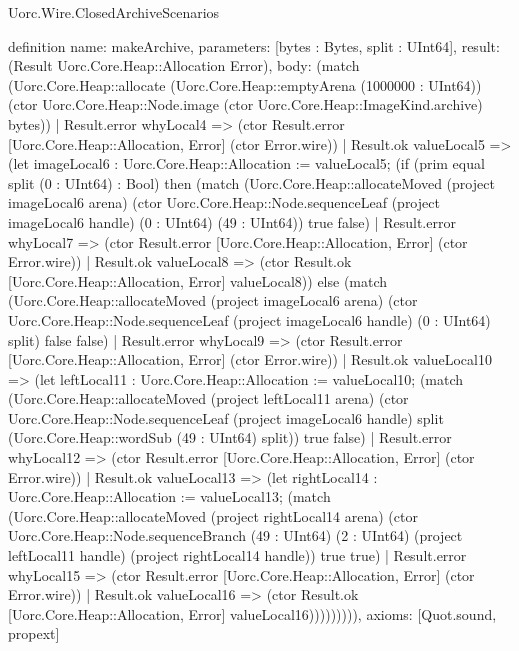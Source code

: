 \begin{lexlean}{Uorc.Wire.ClosedArchiveScenarios}
\begin{semanticmodule}
definition{
  name: makeArchive,
  parameters: [bytes : Bytes, split : UInt64],
  result: (Result Uorc.Core.Heap::Allocation Error),
  body: (match (Uorc.Core.Heap::allocate (Uorc.Core.Heap::emptyArena (1000000 : UInt64)) (ctor Uorc.Core.Heap::Node.image (ctor Uorc.Core.Heap::ImageKind.archive) bytes))
    | Result.error whyLocal4 => (ctor Result.error [Uorc.Core.Heap::Allocation, Error] (ctor Error.wire))
    | Result.ok valueLocal5 => (let imageLocal6 : Uorc.Core.Heap::Allocation := valueLocal5; (if (prim equal split (0 : UInt64) : Bool) then (match (Uorc.Core.Heap::allocateMoved (project imageLocal6 arena) (ctor Uorc.Core.Heap::Node.sequenceLeaf (project imageLocal6 handle) (0 : UInt64) (49 : UInt64)) true false)
      | Result.error whyLocal7 => (ctor Result.error [Uorc.Core.Heap::Allocation, Error] (ctor Error.wire))
      | Result.ok valueLocal8 => (ctor Result.ok [Uorc.Core.Heap::Allocation, Error] valueLocal8)) else (match (Uorc.Core.Heap::allocateMoved (project imageLocal6 arena) (ctor Uorc.Core.Heap::Node.sequenceLeaf (project imageLocal6 handle) (0 : UInt64) split) false false)
      | Result.error whyLocal9 => (ctor Result.error [Uorc.Core.Heap::Allocation, Error] (ctor Error.wire))
      | Result.ok valueLocal10 => (let leftLocal11 : Uorc.Core.Heap::Allocation := valueLocal10; (match (Uorc.Core.Heap::allocateMoved (project leftLocal11 arena) (ctor Uorc.Core.Heap::Node.sequenceLeaf (project imageLocal6 handle) split (Uorc.Core.Heap::wordSub (49 : UInt64) split)) true false)
        | Result.error whyLocal12 => (ctor Result.error [Uorc.Core.Heap::Allocation, Error] (ctor Error.wire))
        | Result.ok valueLocal13 => (let rightLocal14 : Uorc.Core.Heap::Allocation := valueLocal13; (match (Uorc.Core.Heap::allocateMoved (project rightLocal14 arena) (ctor Uorc.Core.Heap::Node.sequenceBranch (49 : UInt64) (2 : UInt64) (project leftLocal11 handle) (project rightLocal14 handle)) true true)
          | Result.error whyLocal15 => (ctor Result.error [Uorc.Core.Heap::Allocation, Error] (ctor Error.wire))
          | Result.ok valueLocal16 => (ctor Result.ok [Uorc.Core.Heap::Allocation, Error] valueLocal16))))))))),
  axioms: [Quot.sound, propext]
}


\end{semanticmodule}
\end{lexlean}

